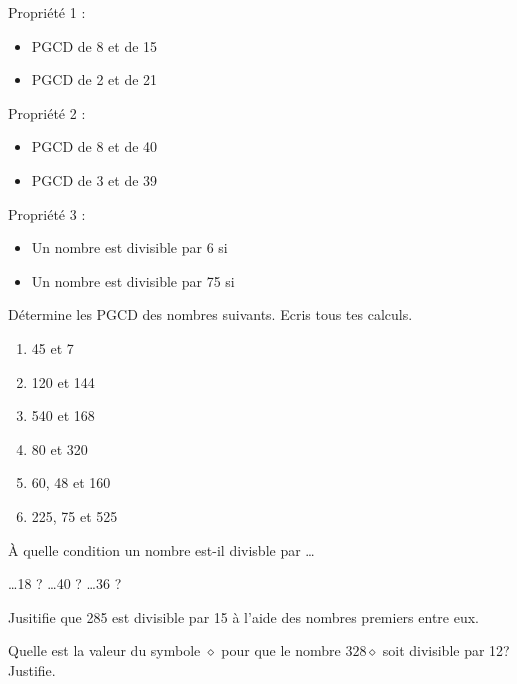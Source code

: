 \documentclass[../math2.tex]{subfiles}
\begin{document}
Propriété 1 :
\exemple
\begin{itemize}[label=$\bullet$, cols=2]
    \item PGCD de 8 et de 15
    \item PGCD de 2 et de 21
\end{itemize}
\vfil
Propriété 2 :
\exemple
\begin{itemize}[label=$\bullet$, cols=2]
    \item PGCD de 8 et de 40
    \item PGCD de 3 et de 39
\end{itemize}
\newpage
Propriété 3 :
\exemple
\begin{itemize}[label=$\bullet$]
    \item Un nombre est divisible par 6 si \dotfill
    \item Un nombre est divisible par 75 si \dotfill
\end{itemize}

\begin{exercise}
    Détermine les PGCD des nombres suivants. Ecris tous tes calculs.
    \begin{enumerate}[cols=2, itemsep= 5cm]
        \item 45 et 7
        \item 120 et 144
        \item 540 et 168
        \item 80 et 320
        \item 60, 48 et 160
        \item 225, 75 et 525
    \end{enumerate}
    \vspace{5cm}
\end{exercise}

\begin{exercise}
    À quelle condition un nombre est-il divisble par \dots
    \begin{tasks}
        \task \dots 18 ? \dotfill
        \task \dots 40 ? \dotfill
        \task \dots 36 ? \dotfill
    \end{tasks}
\end{exercise}

\begin{exercise}
    Jusitifie que 285 est divisible par 15 à l'aide des nombres premiers entre eux.
\end{exercise}

\begin{exercise}
    Quelle est la valeur du symbole $\diamond$  pour que le nombre $328\diamond$  soit divisible par 12? Justifie.
\end{exercise}
\end{document}
